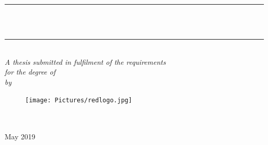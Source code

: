 \documentclass[11pt, a4paper, oneside]{Thesis} %
\title{\ttitle} %
\begin{document}
\makeatletter
\renewcommand*{\NAT@nmfmt}[1]{\textsc{#1}}
\makeatother



\frontmatter %


\fancyhead{} %
\rhead{\thepage} %
\lhead{} %

\pagestyle{fancy} %

\newcommand{\HRule}{\rule{\linewidth}{0.5mm}} %

\hypersetup{pdfsubject=\subjectname}
\hypersetup{pdfauthor=\authornames}
\hypersetup{pdfkeywords=\keywordnames}


\begin{titlepage}
\begin{center}

\HRule \\[0.4cm] %
{\huge \bfseries \ttitle}\\[0.4cm] %
\HRule \\[1.5cm] %
 
\large \textit{A thesis submitted in fulfilment of the requirements\\ for the degree of \degreename}\\[0.3cm] %
\textit{by}\\[0.4cm]%

\authornames

\vfill
\graphicspath{ {./Figures/} }
\begin{figure}[hb]
  \centering
  \texttt{[image: Pictures/redlogo.jpg]}
\end{figure}

\DEPTNAME\\ %
\textsc{ \UNIVNAME}\\[1.5cm] %
\large May 2019\\[2cm] %

\end{center}

\end{titlepage}
\end{document}
